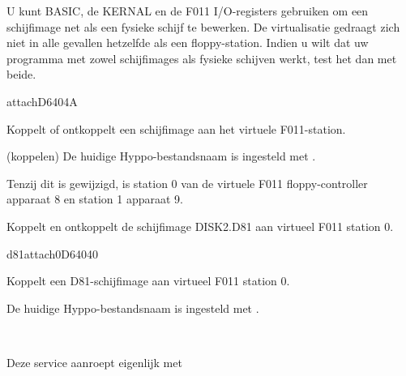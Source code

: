 U kunt BASIC, de KERNAL en de F011 I/O-registers gebruiken om een schijfimage  net als een fysieke schijf te bewerken. De virtualisatie gedraagt zich niet  in alle gevallen hetzelfde als een floppy-station. Indien u wilt dat uw programma  met zowel schijfimages als fysieke schijven werkt, test het dan met beide.

\newpage
\begin{hyppotrap}{attach}{D640}{4A}

\item [Dienst:]  Koppelt of ontkoppelt een schijfimage aan het virtuele F011-station.
\item [Voorbeding:]  (koppelen) De huidige Hyppo-bestandsnaam is ingesteld met .
\item [Invoer:]        
\item [Foutcodes:]          
\item [Geschiedenis:]

\item [Opmerkingen:]  Tenzij dit is gewijzigd, is station 0 van de virtuele F011 floppy-controller  apparaat 8 en station 1 apparaat 9.
\item [Voorbeeld:]  Koppelt en ontkoppelt de schijfimage DISK2.D81 aan virtueel F011 station 0.
\end{hyppotrap}


\begin{hyppotrap}{d81attach0}{D640}{40}

\item [Dienst:]  Koppelt een D81-schijfimage aan virtueel F011 station 0.
\item [Voorbeding:]  De huidige Hyppo-bestandsnaam is ingesteld met .
\item [Geschiedenis:]
  \\
  \item [Opmerkingen:]  Deze service aanroept eigenlijk  met 
\end{hyppotrap}


